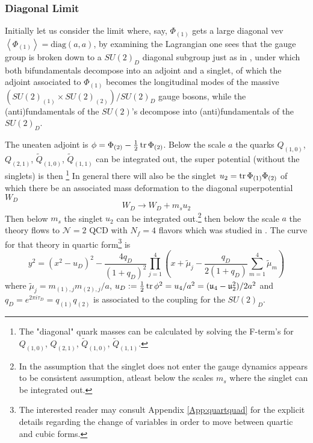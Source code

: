 \documentclass[main.tex]{subfiles}
\begin{document}
\subsubsection{Diagonal Limit}
Initially let us consider the limit where, say, $\Phi_{(1)}$ gets a large diagonal vev $\left<\Phi_{(1)}\right>=\text{diag}(a,a)$, by examining the Lagrangian one sees that the gauge group is broken down to a $SU(2)_D$ diagonal subgroup just as in \cite{Intriligator:1994sm}, under which both bifundamentals decompose into an adjoint and a singlet, of which the adjoint associated to $\Phi_{(1)}$ becomes the longitudinal modes of the massive $(SU(2)_{(1)}\times SU(2)_{(2)})/SU(2)_D$ gauge bosons, while the (anti)fundamentals of the $SU(2)$'s decompose into (anti)fundamentals of the $SU(2)_D$.

The uneaten adjoint is $\phi=\Phi_{(2)}-\frac{1}{2}\operatorname{tr}\Phi_{(2)}$. Below the scale $a$ the quarks $Q_{(1,0)}$, $Q_{(2,1)}$, $\tilde{Q}_{(1,0)}$, $\tilde{Q}_{(1,1)}$ can be integrated out, the super potential (without the singlets) is then \footnote{The "diagonal" quark masses can be calculated by solving the F-term's for $Q_{(1,0)}$, $Q_{(2,1)}$, $\tilde{Q}_{(1,0)}$, $\tilde{Q}_{(1,1)}$.}
In general there will also be the singlet $u_2=\operatorname{tr}\Phi_{(1)}\Phi_{(2)}$ of which there be an associated mass deformation to the diagonal superpotential $W_D$ 
\begin{equation}
W_D\to W_D+m_su_2
\end{equation}
Then below $m_s$ the singlet $u_2$ can be integrated out.\footnote{In \cite{Intriligator:1994sm,Csaki:1997zg,Tachikawa:2011ea} the assumption that the singlet does not enter the gauge dynamics appears to be consistent assumption, atleast below the scales $m_s$ where the singlet can be integrated out.} then below the scale $a$ the theory flows to $\mathcal{N}=2$ QCD with $N_f=4$ flavors \cite{Leigh:1996ds} which was studied in \cite{Seiberg:1994rs}. The curve for that theory in quartic form\footnote{The interested reader may consult Appendix \ref{App:quartquad} for the explicit details regarding the change of variables in order to move between quartic and cubic forms.} is \cite{Argyres:1995wt,Seiberg:1994aj}
\begin{equation}
y^2=(x^2-u_D)^2-\frac{4q_D}{(1+q_D)^2}\prod_{j=1}^4\left(x+\tilde{\mu}_j-\frac{q_D}{2(1+q_D)}\sum_{m=1}^4\tilde{\mu}_m\right)
\end{equation}
where $\tilde{\mu}_j=m_{(1),j}m_{(2),j}/a$, $u_D:=\frac{1}{2}\operatorname{tr}\phi^2=u_4/a^2=(\mathfrak{u}_4-\mathfrak{u}_2^2)/2a^2$ and $q_{D}=e^{2\pi i\tau_{D}}=q_{(1)}q_{(2)}$ is associated to the coupling for the $SU(2)_D$. 
\end{document}
